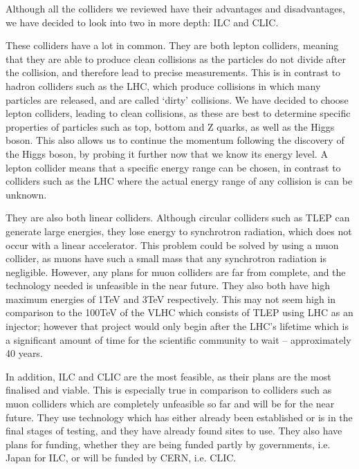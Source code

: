 Although all the colliders we reviewed have their advantages and disadvantages, we have decided to look into two in more depth: ILC and CLIC. 

These colliders have a lot in common. They are both lepton colliders, meaning that they are able to produce clean collisions as the particles do not divide after the collision, and therefore lead to precise measurements. This is in contrast to hadron colliders such as the LHC, which produce collisions in which many particles are released, and are called ‘dirty’ collisions. We have decided to choose lepton colliders, leading to clean collisions, as these are best to determine specific properties of particles such as top, bottom and Z quarks, as well as the Higgs boson. This also allows us to continue the momentum following the discovery of the Higgs boson, by probing it further now that we know its energy level. A lepton collider means that a specific energy range can be chosen, in contrast to colliders such as the LHC where the actual energy range of any collision is can be unknown.

They are also both linear colliders. Although circular colliders such as TLEP can generate large energies, they lose energy to synchrotron radiation, which does not occur with a linear accelerator. This problem could be solved by using a muon collider, as muons have such a small mass that any synchrotron radiation is negligible. However, any plans for muon colliders are far from complete, and the technology needed is unfeasible in the near future. They also both have high maximum energies of 1TeV and 3TeV respectively. This may not seem high in comparison to the 100TeV of the VLHC which consists of TLEP using LHC as an injector; however that project would only begin after the LHC’s lifetime which is a significant amount of time for the scientific community to wait – approximately 40 years.

In addition, ILC and CLIC are the most feasible, as their plans are the most finalised and viable. This is especially true in comparison to colliders such as muon colliders which are completely unfeasible so far and will be for the near future. They use technology which has either already been established or is in the final stages of testing, and they have already found sites to use. They also have plans for funding, whether they are being funded partly by governments, i.e. Japan for ILC, or will be funded by CERN, i.e. CLIC.
